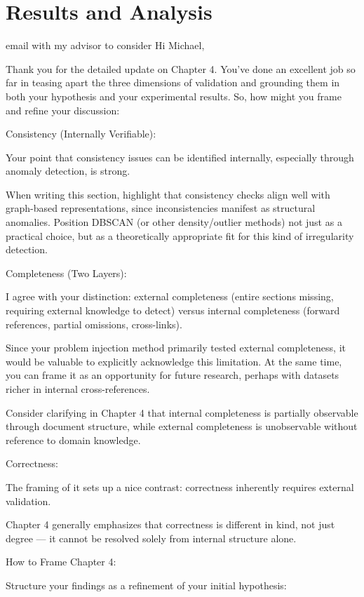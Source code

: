 \chapter{Results and Analysis}
\label{chap:results}

email with my advisor to consider
Hi Michael,

Thank you for the detailed update on Chapter 4. You’ve done an excellent job so far in teasing apart the three dimensions of validation and grounding them in both your hypothesis and your experimental results. So, how might you frame and refine your discussion:

Consistency (Internally Verifiable):

Your point that consistency issues can be identified internally, especially through anomaly detection, is strong.

When writing this section, highlight that consistency checks align well with graph-based representations, since inconsistencies manifest as structural anomalies. Position DBSCAN (or other density/outlier methods) not just as a practical choice, but as a theoretically appropriate fit for this kind of irregularity detection.

Completeness (Two Layers):

I agree with your distinction: external completeness (entire sections missing, requiring external knowledge to detect) versus internal completeness (forward references, partial omissions, cross-links).

Since your problem injection method primarily tested external completeness, it would be valuable to explicitly acknowledge this limitation. At the same time, you can frame it as an opportunity for future research, perhaps with datasets richer in internal cross-references.

Consider clarifying in Chapter 4 that internal completeness is partially observable through document structure, while external completeness is unobservable without reference to domain knowledge.

Correctness:

The framing of it sets up a nice contrast: correctness inherently requires external validation.

Chapter 4 generally emphasizes that correctness is different in kind, not just degree — it cannot be resolved solely from internal structure alone.

How to Frame Chapter 4:

Structure your findings as a refinement of your initial hypothesis:

